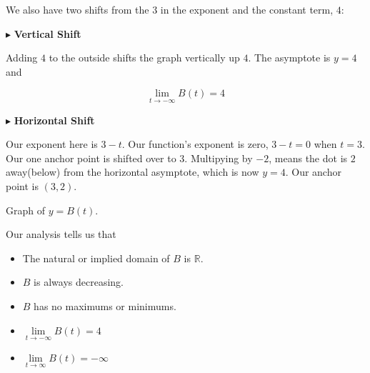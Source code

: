 \documentclass{ximera}
\begin{document}
\begin{example}
\begin{explanation}
We also have two shifts from the $3$ in the exponent and the constant term, $4$:




$\blacktriangleright$ \textbf{Vertical Shift}


Adding $4$ to the outside shifts the graph vertically up $4$.  The asymptote is $y = 4$ and 

\[ \lim\limits_{t \to -\infty} B(t) = 4 \]



$\blacktriangleright$ \textbf{Horizontal Shift}

Our exponent here is $3 - t$.  Our function's exponent is zero, $3-t=0$ when $t=3$. Our one anchor point is shifted over to $3$.  Multipying by $-2$, means the dot is $2$ away(below) from the horizontal asymptote, which is now $y=4$.  Our anchor point is $(3, 2)$.








Graph of $y = B(t)$.

\begin{image}
\end{image}




Our analysis tells us that 

\begin{itemize}
\item The natural or implied domain of $B$ is $\mathbb{R}$.
\item $B$ is always decreasing.
\item $B$ has no maximums or minimums.
\item $\lim\limits_{t \to -\infty} B(t) = 4$
\item $\lim\limits_{t \to \infty} B(t) = -\infty$
\end{itemize}


\end{explanation}

\end{example}
\end{document}
